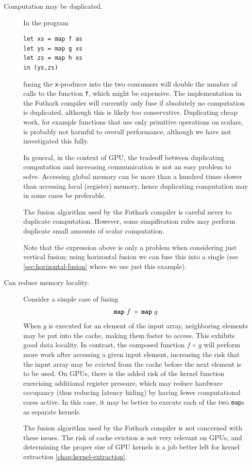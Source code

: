 \begin{description}
\item[Computation may be duplicated.]

In the program
\begin{lstlisting}
let xs = map f as
let ys = map g xs
let zs = map h xs
in (ys,zs)
\end{lstlisting}
\noindent fusing the \texttt{x}-producer into the two consumers will
double the number of calls to the function \texttt{f}, which might be
expensive.  The implementation in the Futhark compiler will currently
only fuse if absolutely no computation is duplicated, although this is
likely too conservative.  Duplicating cheap work, for example
functions that use only primitive operations on scalars, is probably
not harmful to overall performance, although we have not investigated
this fully.

In general, in the context of GPU, the tradeoff between duplicating
computation and increasing communication is not an easy problem to
solve.  Accessing global memory can be more than a hundred times
slower than accessing local (register) memory, hence duplicating
computation may in some cases be preferable.

The fusion algorithm used by the Futhark compiler is careful never to
duplicate computation.  However, some simpification rules may perform
duplicate small amounts of scalar computation.

Note that the expression above is only a problem when considering just
vertical fusion; using horizontal fusion we can fuse this into a
single  (see \cref{sec:horizontal-fusion} where we use just
this example).

\item[Can reduce memory locality.]
  Consider a simple case of fusing
  \[
    \mbox{\texttt{\bfseries{map}}}~f~\circ~\mbox{\texttt{\bfseries{map}}}~g
  \]
  When $g$ is executed for an element of the input array, neighboring
  elements may be put into the cache, making them faster to access.
  This exhibits good data locality.  In contrast, the composed
  function $f~\circ~g$ will perform more work after accessing a given
  input element, increasing the risk that the input array may be
  evicted from the cache before the next element is to be used.  On
  GPUs, there is the added risk of the kernel function exercising
  additional register pressure, which may reduce hardware occupancy
  (thus reducing latency hiding) by having fewer computational cores
  active.  In this case, it may be better to execute each of the two
  \texttt{map}s as separate kernels.

  The fusion algorithm used by the Futhark compiler is not concerned
  with these issues.  The risk of cache eviction is not very relevant
  on GPUs, and determining the proper size of GPU kernels is a job
  better left for kernel extraction \cref{chap:kernel-extraction}.
\end{description}

